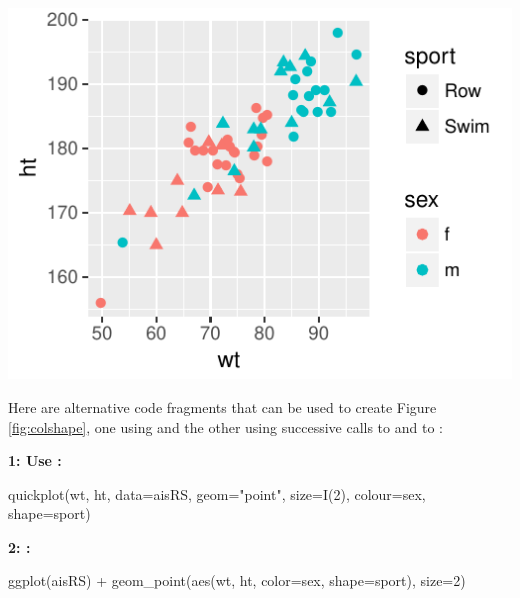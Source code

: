 \begin{marginfigure}[-72pt]
\begin{Schunk}


\centerline{\includegraphics[width=\textwidth]{figs/09-quick-rs1-1} }

\end{Schunk}
\caption{Use \texttt{color} for distinguishing \texttt{sex}es,
\texttt{shape}s for \texttt{sport}s.
Figure \ref{col:colshape} in Appendix \ref{app:C}
shows the graph in color.}\label{fig:colshape}

\end{marginfigure}

Here are alternative code fragments that can be used to create
Figure \ref{fig:colshape}, one using  and the other
using successive calls to  and to :
\vspace*{9pt}

\begin{fullwidth}
\begin{minipage}[t]{0.36\linewidth}
{\bf 1: Use :}
\begin{Schunk}
\begin{Sinput}
quickplot(wt, ht,
          data=aisRS,
          geom="point",
          size=I(2),
          colour=sex,
          shape=sport)
\end{Sinput}
\end{Schunk}
\end{minipage}
\hspace*{0.04\textwidth}
\begin{minipage}[t]{0.4\linewidth}
{\bf 2: :}
\begin{Schunk}
\begin{Sinput}
ggplot(aisRS) +
  geom_point(aes(wt, ht,
               color=sex,
               shape=sport),
             size=2)
\end{Sinput}
\end{Schunk}
\end{minipage}
\end{fullwidth}

